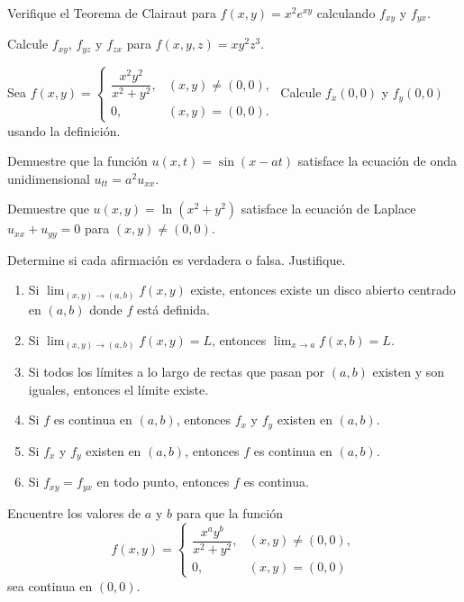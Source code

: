 \begin{prob}
Verifique el Teorema de Clairaut para $f(x,y)=x^2 e^{xy}$ calculando
$f_{xy}$ y $f_{yx}$.
\end{prob}

\begin{prob}
Calcule $f_{xy}$, $f_{yz}$ y $f_{zx}$ para $f(x,y,z)=x y^2 z^3$.
\end{prob}

\begin{prob}
Sea $f(x,y)=\begin{cases}
\dfrac{x^2 y^2}{x^2+y^2}, & (x,y)\neq(0,0),\\
0, & (x,y)=(0,0).
\end{cases}$
Calcule $f_x(0,0)$ y $f_y(0,0)$ usando la definición.
\end{prob}

\begin{prob}
Demuestre que la función $u(x,t)=\sin(x-at)$ satisface la ecuación de
onda unidimensional $u_{tt}=a^2 u_{xx}$.
\end{prob}

\begin{prob}
Demuestre que $u(x,y)=\ln(x^2+y^2)$ satisface la ecuación de Laplace
$u_{xx}+u_{yy}=0$ para $(x,y)\neq(0,0)$.
\end{prob}

\begin{prob}
Determine si cada afirmación es verdadera o falsa. Justifique.
\begin{enumerate}
    \item Si $\lim_{(x,y)\to(a,b)} f(x,y)$ existe, entonces existe un
    disco abierto centrado en $(a,b)$ donde $f$ está definida.
    \item Si $\lim_{(x,y)\to(a,b)} f(x,y)=L$, entonces
    $\lim_{x\to a} f(x,b)=L$.
    \item Si todos los límites a lo largo de rectas que pasan por
    $(a,b)$ existen y son iguales, entonces el límite existe.
    \item Si $f$ es continua en $(a,b)$, entonces $f_x$ y $f_y$ existen
    en $(a,b)$.
    \item Si $f_x$ y $f_y$ existen en $(a,b)$, entonces $f$ es continua
    en $(a,b)$.
    \item Si $f_{xy}=f_{yx}$ en todo punto, entonces $f$ es continua.
\end{enumerate}
\end{prob}

\begin{prob}
Encuentre los valores de $a$ y $b$ para que la función
\[
f(x,y)=
\begin{cases}
\dfrac{x^a y^b}{x^2+y^2}, & (x,y)\neq(0,0),\\
0, & (x,y)=(0,0)
\end{cases}
\]
sea continua en $(0,0)$.
\end{prob}
